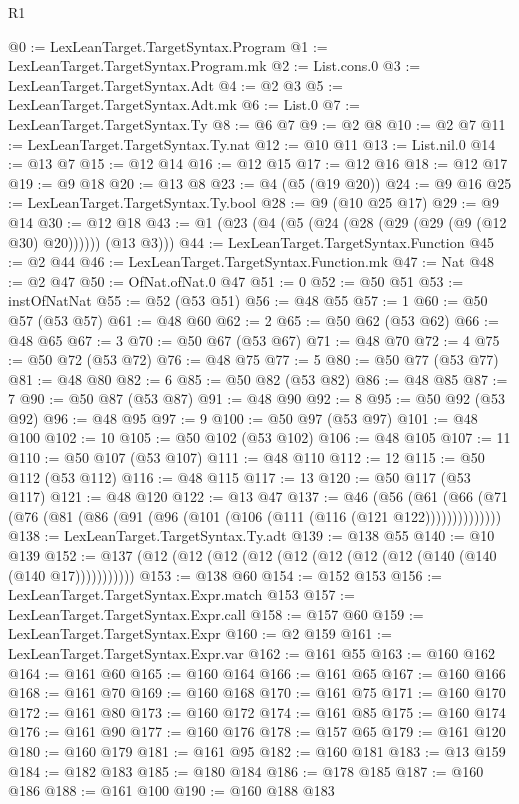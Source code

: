 \begin{lexlean}{R1}
\begin{coremodule}
@0 := LexLeanTarget.TargetSyntax.Program
@1 := LexLeanTarget.TargetSyntax.Program.mk
@2 := List.cons.{0}
@3 := LexLeanTarget.TargetSyntax.Adt
@4 := @2 @3
@5 := LexLeanTarget.TargetSyntax.Adt.mk
@6 := List.{0}
@7 := LexLeanTarget.TargetSyntax.Ty
@8 := @6 @7
@9 := @2 @8
@10 := @2 @7
@11 := LexLeanTarget.TargetSyntax.Ty.nat
@12 := @10 @11
@13 := List.nil.{0}
@14 := @13 @7
@15 := @12 @14
@16 := @12 @15
@17 := @12 @16
@18 := @12 @17
@19 := @9 @18
@20 := @13 @8
@23 := @4 (@5 (@19 @20))
@24 := @9 @16
@25 := LexLeanTarget.TargetSyntax.Ty.bool
@28 := @9 (@10 @25 @17)
@29 := @9 @14
@30 := @12 @18
@43 := @1 (@23 (@4 (@5 (@24 (@28 (@29 (@29 (@9 (@12 @30) @20)))))) (@13 @3)))
@44 := LexLeanTarget.TargetSyntax.Function
@45 := @2 @44
@46 := LexLeanTarget.TargetSyntax.Function.mk
@47 := Nat
@48 := @2 @47
@50 := OfNat.ofNat.{0} @47
@51 := 0
@52 := @50 @51
@53 := instOfNatNat
@55 := @52 (@53 @51)
@56 := @48 @55
@57 := 1
@60 := @50 @57 (@53 @57)
@61 := @48 @60
@62 := 2
@65 := @50 @62 (@53 @62)
@66 := @48 @65
@67 := 3
@70 := @50 @67 (@53 @67)
@71 := @48 @70
@72 := 4
@75 := @50 @72 (@53 @72)
@76 := @48 @75
@77 := 5
@80 := @50 @77 (@53 @77)
@81 := @48 @80
@82 := 6
@85 := @50 @82 (@53 @82)
@86 := @48 @85
@87 := 7
@90 := @50 @87 (@53 @87)
@91 := @48 @90
@92 := 8
@95 := @50 @92 (@53 @92)
@96 := @48 @95
@97 := 9
@100 := @50 @97 (@53 @97)
@101 := @48 @100
@102 := 10
@105 := @50 @102 (@53 @102)
@106 := @48 @105
@107 := 11
@110 := @50 @107 (@53 @107)
@111 := @48 @110
@112 := 12
@115 := @50 @112 (@53 @112)
@116 := @48 @115
@117 := 13
@120 := @50 @117 (@53 @117)
@121 := @48 @120
@122 := @13 @47
@137 := @46
    (@56 (@61 (@66 (@71 (@76 (@81 (@86 (@91 (@96 (@101 (@106 (@111 (@116 (@121 @122))))))))))))))
@138 := LexLeanTarget.TargetSyntax.Ty.adt
@139 := @138 @55
@140 := @10 @139
@152 := @137 (@12 (@12 (@12 (@12 (@12 (@12 (@12 (@12 (@140 (@140 (@140 @17)))))))))))
@153 := @138 @60
@154 := @152 @153
@156 := LexLeanTarget.TargetSyntax.Expr.match @153
@157 := LexLeanTarget.TargetSyntax.Expr.call
@158 := @157 @60
@159 := LexLeanTarget.TargetSyntax.Expr
@160 := @2 @159
@161 := LexLeanTarget.TargetSyntax.Expr.var
@162 := @161 @55
@163 := @160 @162
@164 := @161 @60
@165 := @160 @164
@166 := @161 @65
@167 := @160 @166
@168 := @161 @70
@169 := @160 @168
@170 := @161 @75
@171 := @160 @170
@172 := @161 @80
@173 := @160 @172
@174 := @161 @85
@175 := @160 @174
@176 := @161 @90
@177 := @160 @176
@178 := @157 @65
@179 := @161 @120
@180 := @160 @179
@181 := @161 @95
@182 := @160 @181
@183 := @13 @159
@184 := @182 @183
@185 := @180 @184
@186 := @178 @185
@187 := @160 @186
@188 := @161 @100
@190 := @160 @188 @183

\end{coremodule}
\end{lexlean}
